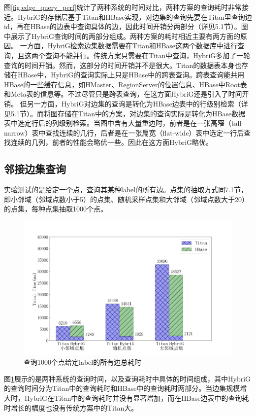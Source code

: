 图\ref{fig:edge_query_perf}统计了两种系统的时间对比，两种方案的查询耗时非常接近。HybriG的存储层基于Titan和HBase实现，对边集的查询先要在Titan里查询边id，再在HBase的边表中查询具体的边，因此时间开销分两部分（详见5.1节）。图中展示了HybriG查询时间的两部分组成。两种方案的耗时相近主要有两方面的原因。
一方面，HybriG检索边集数据需要在Titan和HBase这两个数据库中进行查询，且这两个查询不能并行。传统方案只需要在Titan中查询，HybriG多加了一轮查询的时间开销。然而，这部分的时间开销并不是很大。Titan的数据表本身也存储在HBase中，HybriG的查询实际上只是HBase中的跨表查询。跨表查询能共用HBase的一些缓存信息，如HMaster、RegionServer的位置信息、HBase中Root表和Meta表的信息等。不过尽管只是跨表查询，在这方面HybriG还是引入了时间开销。
但另一方面，HybriG对边集的查询是转化为HBase边表中的行级别检索（详见5.1节）。而将图存储在Titan中的方案，对边集的查询实际是转化为HBase数据表中选定行后的列级别检索。当图中含有大量重边时，前者是在一张高窄（tall-narrow）表中查找连续的几行，后者是在一张扁宽（flat-wide）表中选定一行后查找连续的几列，前者的性能会略优一些。因此在这方面HybriG略优。


\subsection{邻接边集查询}
实验测试的是给定一个点，查询其某种label的所有边。点集的抽取方式同7.1节，即小邻域（邻域点数小于5）的点集、随机采样点集和大邻域（邻域点数大于20）的点集，每种点集抽取1000个点。

\begin{figure}[htbp]
\centering
\includegraphics[width=140mm]{fig/get_edges.png}
\caption{查询1000个点给定label的所有边总耗时}
\label{fig:get_edges}
\end{figure}

图\ref{fig:get_edges}展示的是两种系统的查询时间，以及查询耗时中具体的时间组成，其中HybriG的查询时间分为Titan中的查询耗时和HBase中的查询耗时两部分。当边集规模增大时，HybriG在Titan中的查询耗时并没有显著增加，而在HBase边表中的查询耗时增长的幅度也没有传统方案中的Titan大。


